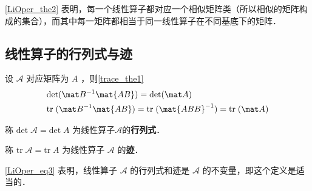 \autoref{LiOper_the2} 表明，每一个线性算子都对应一个相似矩阵类（所以相似的矩阵构成的集合），而其中每一矩阵都相当于同一线性算子在不同基底下的矩阵．
\subsection{线性算子的行列式与迹}\label{LiOper_sub2}
设 $\mathcal{A}$ 对应矩阵为 $A$ ，则\autoref{trace_the1}~ 
\begin{equation}\label{LiOper_eq3}
\begin{aligned}
&\mathrm{det}(\mat B^{-1}\mat{AB})=\mathrm{det}(\mat A)\\
&\mathrm{tr}\;(\mat B^{-1}\mat{AB})=\mathrm{tr}\;(\mat{ABB}^{-1})=\mathrm{tr}\;(\mat A)
\end{aligned}
\end{equation}
\begin{definition}{}
称
$
\mathrm{det}\;\mathcal{A}=\mathrm{det}\;A
$
为线性算子$\mathcal{A}$的\textbf{行列式}．

称
$
\mathrm{tr}\;\mathcal{A}=\mathrm{tr}\;A
$
为线性算子 $\mathcal{A}$ 的\textbf{迹}．
\end{definition}
\autoref{LiOper_eq3} 表明，线性算子 $\mathcal{A}$ 的行列式和迹是 $\mathcal{A}$ 的不变量，即这个定义是适当的．